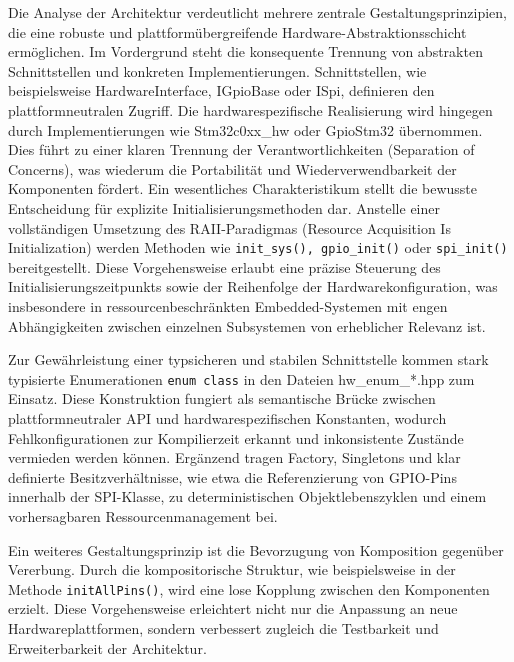 \vspace{0.5cm}
\vspace{0.5cm}

Die Analyse der Architektur verdeutlicht mehrere zentrale Gestaltungsprinzipien, die eine robuste und plattformübergreifende Hardware-Abstraktionsschicht ermöglichen. 
Im Vordergrund steht die konsequente Trennung von abstrakten Schnittstellen und konkreten Implementierungen. 
Schnittstellen, wie beispielsweise HardwareInterface, IGpioBase oder ISpi, definieren den plattformneutralen Zugriff. 
Die hardwarespezifische Realisierung wird hingegen durch Implementierungen wie Stm32c0xx\_hw oder GpioStm32 übernommen.
Dies führt zu einer klaren Trennung der Verantwortlichkeiten (Separation of Concerns), was wiederum die Portabilität und Wiederverwendbarkeit der Komponenten fördert.
Ein wesentliches Charakteristikum stellt die bewusste Entscheidung für explizite Initialisierungsmethoden dar. 
Anstelle einer vollständigen Umsetzung des RAII-Paradigmas (Resource Acquisition Is Initialization) werden Methoden wie \texttt{init\_sys(), gpio\_init()} oder \texttt{spi\_init()} bereitgestellt. 
Diese Vorgehensweise erlaubt eine präzise Steuerung des Initialisierungszeitpunkts sowie der Reihenfolge der Hardwarekonfiguration, was insbesondere in ressourcenbeschränkten Embedded-Systemen mit engen Abhängigkeiten zwischen einzelnen Subsystemen von erheblicher Relevanz ist.

Zur Gewährleistung einer typsicheren und stabilen Schnittstelle kommen stark typisierte Enumerationen \texttt{enum class} in den Dateien hw\_enum\_*.hpp zum Einsatz. 
Diese Konstruktion fungiert als semantische Brücke zwischen plattformneutraler API und hardwarespezifischen Konstanten, wodurch Fehlkonfigurationen zur Kompilierzeit erkannt und inkonsistente Zustände vermieden werden können. 
Ergänzend tragen Factory, Singletons und klar definierte Besitzverhältnisse, wie etwa die Referenzierung von GPIO-Pins innerhalb der SPI-Klasse, zu deterministischen Objektlebenszyklen und einem vorhersagbaren Ressourcenmanagement bei.

Ein weiteres Gestaltungsprinzip ist die Bevorzugung von Komposition gegenüber Vererbung. 
Durch die kompositorische Struktur, wie beispielsweise in der Methode \texttt{initAllPins()}, wird eine lose Kopplung zwischen den Komponenten erzielt. 
Diese Vorgehensweise erleichtert nicht nur die Anpassung an neue Hardwareplattformen, sondern verbessert zugleich die Testbarkeit und Erweiterbarkeit der Architektur.


